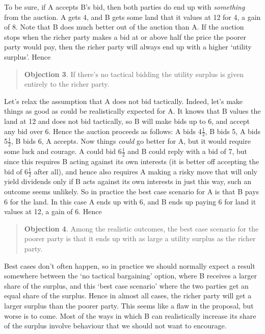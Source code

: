 \documentclass[
  10pt,
  letterpaper,
  DIV=11,
  numbers=noendperiod,
  twoside]{scrartcl}
\begin{document}
To be sure, if A accepts B's bid, then both parties do end up with
\emph{something} from the auction. A gets 4, and B gets some land that
it values at 12 for 4, a gain of 8. Note that B does much better out of
the auction than A. If the auction stops when the richer party makes a
bid at or above half the price the poorer party would pay, then the
richer party will always end up with a higher `utility surplus'. Hence

\begin{quote}
\textbf{Objection 3}. If there's no tactical bidding the utility surplus
is given entirely to the richer party.
\end{quote}

Let's relax the assumption that A does not bid tactically. Indeed, let's
make things as good as could be realistically expected for A. It knows
that B values the land at 12 and does not bid tactically, so B will make
bids up to 6, and accept any bid over 6. Hence the auction proceeds as
follows: A bids 4\(\frac{1}{2}\), B bids 5, A bids 5\(\frac{1}{2}\), B
bids 6, A accepts. Now things \emph{could} go better for A, but it would
require some luck and courage. A could bid 6\(\frac{1}{2}\) and B could
reply with a bid of 7, but since this requires B acting against its own
interests (it is better off accepting the bid of 6\(\frac{1}{2}\) after
all), and hence also requires A making a risky move that will only yield
dividends only if B acts against its own interests in just this way,
such an outcome seems unlikely. So in practice the best case scenario
for A is that B pays 6 for the land. In this case A ends up with 6, and
B ends up paying 6 for land it values at 12, a gain of 6. Hence

\begin{quote}
\textbf{Objection 4}. Among the realistic outcomes, the best case
scenario for the poorer party is that it ends up with as large a utility
surplus as the richer party.
\end{quote}

Best cases don't often happen, so in practice we should normally expect
a result somewhere between the `no tactical bargaining' option, where B
receives a larger share of the surplus, and this `best case scenario'
where the two parties get an equal share of the surplus. Hence in almost
all cases, the richer party will get a larger surplus than the poorer
party. This seems like a flaw in the proposal, but worse is to come.
Most of the ways in which B can realistically increase its share of the
surplus involve behaviour that we should not want to encourage.
\end{document}
